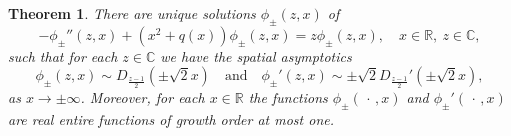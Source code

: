\documentclass{amsart}
\newtheorem{theorem}{Theorem}[section]
\numberwithin{equation}{section}
\begin{document}
\begin{theorem}\label{thmpertharmPHI}
There are unique solutions $\phi_\pm(z,x)$ of
\begin{equation}
   -\phi_\pm''(z,x) + \left(x^2+q(x)\right) \phi_\pm(z,x) = z \phi_\pm(z,x), \quad x\in{{\mathbb R}},~z\in{{\mathbb C}},
\end{equation}
such that for each $z\in{{\mathbb C}}$ we have the spatial asymptotics
\begin{equation}
    \phi_\pm(z,x) \sim D_{\frac{z-1}{2}}(\pm\sqrt{2}x) \quad\text{and}\quad \phi_\pm'(z,x)\sim \pm\sqrt{2} D_{\frac{z-1}{2}}'(\pm\sqrt{2}x),
\end{equation}
as $x\rightarrow \pm\infty$.
 Moreover, for each $x\in{{\mathbb R}}$ the functions $\phi_\pm(\,\cdot\,,x)$ and $\phi_\pm'(\,\cdot\,,x)$ are real entire functions of growth order at most one.
\end{theorem}
 
\end{document}
